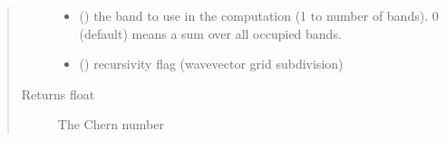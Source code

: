 \documentclass[letterpaper,10pt,english]{sphinxmanual}
\begin{document}
\begin{fulllineitems}
\begin{quote}
\begin{description}
\begin{itemize}
\item {} 
\sphinxAtStartPar
{} () \textendash{} the band to use in the computation (1 to number of bands). 0 (default) means a sum over all occupied bands.

\item {} 
\sphinxAtStartPar
{} () \textendash{} recursivity flag (wavevector grid subdivision)

\end{itemize}

\item[{Returns float}] \leavevmode
\sphinxAtStartPar
The Chern number

\end{description}\end{quote}

\end{fulllineitems}

\end{document}
